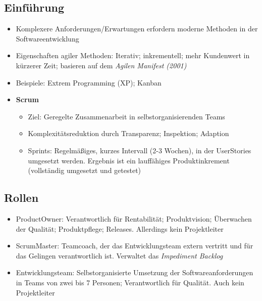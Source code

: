 \subsection{Einführung}
\begin{itemize}
	\item Komplexere Anforderungen/Erwartungen erfordern moderne Methoden in der Softwareentwicklung
	\item Eigenschaften agiler Methoden: Iterativ; inkrementell; mehr Kundenwert in kürzerer Zeit; basieren auf dem \textit{Agilen Manifest (2001)}
	\item Beispiele: Extrem Programming (XP); Kanban
	\item \textbf{Scrum}
	\begin{itemize}
		\item Ziel: Geregelte Zusammenarbeit in selbstorganisierenden Teams
		\item Komplexitätsreduktion durch Transparenz; Inspektion; Adaption
		\item Sprints: Regelmäßiges, kurzes Intervall (2-3 Wochen), in der UserStories umgesetzt werden. Ergebnis ist ein lauffähiges Produktinkrement (vollständig umgesetzt und getestet)
	\end{itemize}
\end{itemize}


\subsection{Rollen}
\begin{itemize}
	\item ProductOwner: Verantwortlich für Rentabilität; Produktvision; Überwachen der Qualität; Produktpflege; Releases. Allerdings kein Projektleiter
	\item ScrumMaster: Teamcoach, der das Entwicklungsteam extern vertritt und für das Gelingen verantwortlich ist. Verwaltet das \textit{Impediment Backlog}
	\item Entwicklungsteam: Selbstorganisierte Umsetzung der Softwareanforderungen in Teams von zwei bis 7 Personen; Verantwortlich für Qualität. Auch kein Projektleiter
\end{itemize}


